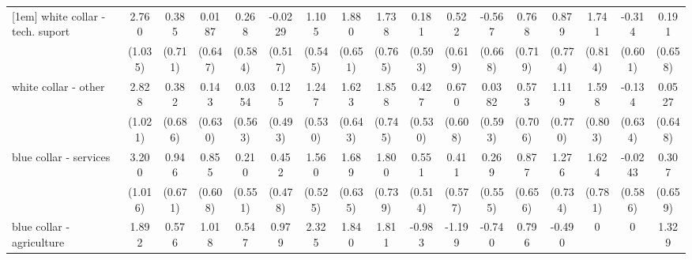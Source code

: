 {\begin{tabular}{l*{16}{c}}
[1em]
white collar - tech. suport&       2.760\sym{**} &       0.385         &      0.0187         &       0.268         &     -0.0229         &       1.105\sym{*}  &       1.880\sym{**} &       1.738\sym{*}  &       0.181         &       0.522         &      -0.567         &       0.768         &       0.879         &       1.741\sym{*}  &      -0.314         &       0.191         \\
                    &     (1.035)         &     (0.711)         &     (0.647)         &     (0.584)         &     (0.517)         &     (0.545)         &     (0.651)         &     (0.765)         &     (0.593)         &     (0.619)         &     (0.668)         &     (0.719)         &     (0.774)         &     (0.814)         &     (0.601)         &     (0.658)         \\
[1em]
white collar - other&       2.828\sym{**} &       0.382         &       0.143         &      0.0354         &       0.125         &       1.247\sym{*}  &       1.623\sym{*}  &       1.858\sym{*}  &       0.427         &       0.670         &      0.0382         &       0.573         &       1.119         &       1.598\sym{*}  &      -0.134         &      0.0527         \\
                    &     (1.021)         &     (0.686)         &     (0.630)         &     (0.563)         &     (0.493)         &     (0.530)         &     (0.643)         &     (0.745)         &     (0.530)         &     (0.608)         &     (0.593)         &     (0.706)         &     (0.770)         &     (0.803)         &     (0.634)         &     (0.648)         \\
[1em]
blue collar - services&       3.200\sym{**} &       0.946         &       0.855         &       0.210         &       0.452         &       1.560\sym{**} &       1.689\sym{**} &       1.800\sym{*}  &       0.551         &       0.411         &       0.269         &       0.877         &       1.276         &       1.624\sym{*}  &     -0.0243         &       0.307         \\
                    &     (1.016)         &     (0.671)         &     (0.608)         &     (0.551)         &     (0.478)         &     (0.525)         &     (0.635)         &     (0.739)         &     (0.514)         &     (0.577)         &     (0.555)         &     (0.656)         &     (0.734)         &     (0.781)         &     (0.586)         &     (0.659)         \\
[1em]
blue collar - agriculture&       1.892         &       0.576         &       1.018         &       0.547         &       0.979         &       2.325\sym{**} &       1.840\sym{*}  &       1.811         &      -0.983         &      -1.199         &      -0.740         &       0.796         &      -0.490         &           0         &           0         &       1.329         \\

\end{tabular}}
